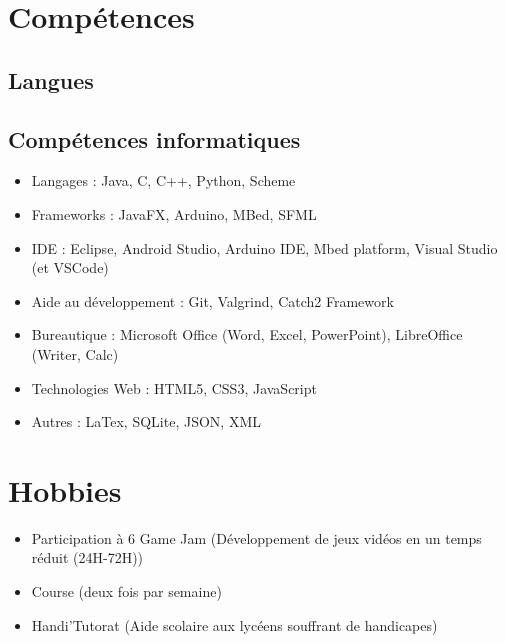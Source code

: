 \documentclass[11pt, a4paper, sans]{moderncv}
\begin{document}
\section{Compétences}
\subsection{Langues}
\subsection{Compétences informatiques}
	\begin{itemize}
		\item Langages : Java, C, C++, Python, Scheme
		\item Frameworks : JavaFX, Arduino, MBed, SFML
		\item IDE : Eclipse, Android Studio, Arduino IDE, Mbed platform, Visual Studio (et VSCode)
		
		\item Aide au développement : Git, Valgrind, Catch2 Framework
		\item Bureautique : Microsoft Office (Word, Excel, PowerPoint), LibreOffice (Writer, Calc)
		\item Technologies Web : HTML5, CSS3, JavaScript
		\item Autres : LaTex, SQLite, JSON, XML
	\end{itemize}

\section{Hobbies}
\begin{itemize}[label=\textbullet]
	\item Participation à 6 Game Jam (Développement de jeux vidéos en un temps réduit (24H-72H))
	\item Course (deux fois par semaine)
	\item Handi'Tutorat (Aide scolaire aux lycéens souffrant de handicapes)
\end{itemize}
\end{document}
